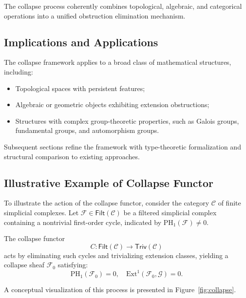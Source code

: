 \documentclass[11pt]{article}
\begin{document}
The collapse process coherently combines topological, algebraic, and categorical operations into a unified obstruction elimination mechanism.

\subsection{Implications and Applications}

The collapse framework applies to a broad class of mathematical structures, including:

\begin{itemize}
    \item Topological spaces with persistent features;
    \item Algebraic or geometric objects exhibiting extension obstructions;
    \item Structures with complex group-theoretic properties, such as Galois groups, fundamental groups, and automorphism groups.
\end{itemize}

Subsequent sections refine the framework with type-theoretic formalization and structural comparison to existing approaches.

\subsection{Illustrative Example of Collapse Functor}

To illustrate the action of the collapse functor, consider the category $\mathcal{C}$ of finite simplicial complexes. Let $\mathcal{F} \in \mathsf{Filt}(\mathcal{C})$ be a filtered simplicial complex containing a nontrivial first-order cycle, indicated by $\mathrm{PH}_1(\mathcal{F}) \neq 0$.

The collapse functor
\[
C : \mathsf{Filt}(\mathcal{C}) \longrightarrow \mathsf{Triv}(\mathcal{C})
\]
acts by eliminating such cycles and trivializing extension classes, yielding a collapse sheaf $\mathcal{F}_0$ satisfying:
\[
\mathrm{PH}_1(\mathcal{F}_0) = 0, \quad \mathrm{Ext}^1(\mathcal{F}_0, \mathcal{G}) = 0.
\]

A conceptual visualization of this process is presented in Figure~\ref{fig:collapse}.
\end{document}
